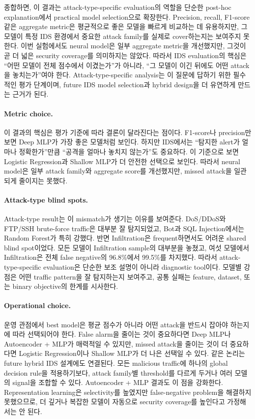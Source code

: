 \documentclass[sigconf,nonacm]{acmart}
\begin{document}
종합하면, 이 결과는 attack-type-specific evaluation의 역할을 단순한 post-hoc explanation에서 practical model selection으로 확장한다.
Precision, recall, F1-score 같은 aggregate metric은 평균적으로 좋은 모델을 빠르게 비교하는 데 유용하지만, 그 모델이 특정 IDS 환경에서 중요한 attack family를 실제로 cover하는지는 보여주지 못한다.
이번 실험에서도 neural model은 일부 aggregate metric을 개선했지만, 그것이 곧 더 넓은 security coverage를 의미하지는 않았다.
따라서 IDS evaluation의 핵심은 “어떤 모델이 전체 점수에서 이겼는가”가 아니라, “그 모델이 이긴 뒤에도 어떤 attack을 놓치는가”여야 한다.
Attack-type-specific analysis는 이 질문에 답하기 위한 필수적인 평가 단계이며, future IDS model selection과 hybrid design을 더 유연하게 만드는 근거가 된다.

\paragraph{Metric choice.}
이 결과의 핵심은 평가 기준에 따라 결론이 달라진다는 점이다.
F1-score나 precision만 보면 Deep MLP가 가장 좋은 모델처럼 보인다.
하지만 IDS에서는 “탐지한 alert가 얼마나 정확한가”만큼 “공격을 얼마나 놓치지 않는가”도 중요하다.
이 기준으로 보면 Logistic Regression과 Shallow MLP가 더 안전한 선택으로 보인다.
따라서 neural model은 일부 attack family와 aggregate score를 개선했지만, missed attack을 일관되게 줄이지는 못했다.

\paragraph{Attack-type blind spots.}
Attack-type result는 이 mismatch가 생기는 이유를 보여준다.
DoS/DDoS와 FTP/SSH brute-force traffic은 대부분 잘 탐지되었고, Bot과 SQL Injection에서는 Random Forest가 특히 강했다.
반면 Infiltration은 frequent하면서도 어려운 shared blind spot이었다.
모든 모델이 Infiltration sample의 대부분을 놓쳤고, 여섯 모델에서 Infiltration은 전체 false negative의 96.8\%에서 99.5\%를 차지했다.
따라서 attack-type-specific evaluation은 단순한 보조 설명이 아니라 diagnostic tool이다.
모델별 강점은 어떤 traffic pattern을 잘 탐지하는지 보여주고, 공통 실패는 feature, dataset, 또는 binary objective의 한계를 시사한다.

\paragraph{Operational choice.}
운영 관점에서 best model은 평균 점수가 아니라 어떤 attack을 반드시 잡아야 하는지에 따라 선택되어야 한다.
False alarm을 줄이는 것이 중요하다면 Deep MLP나 Autoencoder + MLP가 매력적일 수 있지만, missed attack을 줄이는 것이 더 중요하다면 Logistic Regression이나 Shallow MLP가 더 나은 선택일 수 있다.
같은 논리는 future hybrid IDS 설계에도 연결된다.
모든 malicious traffic에 하나의 global decision rule을 적용하기보다, attack family별 threshold를 다르게 두거나 여러 모델의 signal을 조합할 수 있다.
Autoencoder + MLP 결과도 이 점을 강화한다.
Representation learning은 selectivity를 높였지만 false-negative problem을 해결하지 못했으므로, 더 깊거나 복잡한 모델이 자동으로 security coverage를 높인다고 가정해서는 안 된다.
\end{document}
